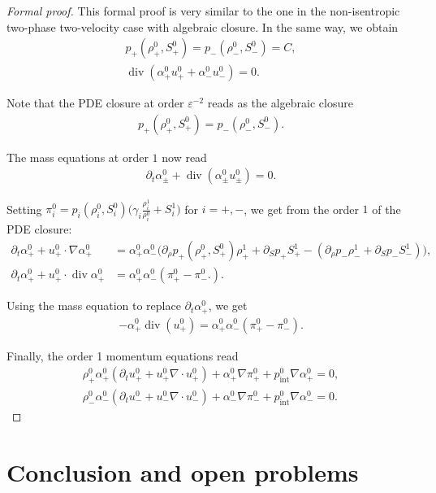 \documentclass[11pt, twoside, a4paper]{article}
\theoremstyle{plain}
\theoremstyle{remark}
\numberwithin{equation}{section}
\renewcommand{\div}{\operatorname{div}}
\newcommand{\dt}{\partial_t}
\newcommand{\eps}{\varepsilon}
\newcommand{\ap}{\alpha_+}
\newcommand{\am}{\alpha_-}
\newcommand{\rp}{\rho_+}
\newcommand{\rmi}{\rho_-}
\begin{document}
\begin{proof}[Formal proof]
This formal proof is very similar to the one in the non-isentropic two-phase two-velocity case with algebraic closure. In the same way, we obtain
\begin{align*}
     p_+ (\rp^0,S_+^0) = p_-(\rmi^0,S_-^0) = C,\\
     \div (\ap^0 u_+^0 + \am^0 u_-^0) = 0.
\end{align*}

Note that the PDE closure at order $\eps^{-2}$ reads as the algebraic closure
\begin{align*}
    p_+ (\rp^0,S_+^0) = p_-(\rmi^0,S_-^0).
\end{align*}


The mass equations at order $1$ now read
\begin{align*}
    \dt \alpha_\pm^0 + \div (\alpha_\pm^0 u_\pm^0)=0.
\end{align*}

Setting $\pi_i^0 = p_i(\rho_i^0,S_i^0) \Big( \gamma_i \frac{\rho_i^1}{\rho_i^0} + S_i^1 \Big)$ for $i=+,-$, we get from the order $1$ of the PDE closure:
\begin{align*}
    \dt \ap^0 + u_+^0 \cdot \nabla \ap^0 &= \ap^0 \am^0 \Big( \partial_\rho p_+(\rp^0,S_+^0)\rp^1 + \partial_S p_+ S_+^1 - (\partial_\rho p_- \rmi^1 + \partial_S p_- S_-^1) \Big),\\
    \dt \ap^0 + u_+^0 \cdot \div \ap^0 &= \ap^0 \am^0 (\pi_+^0 - \pi_-^0. ).
\end{align*}

Using the mass equation to replace $\dt \ap^0$, we get
\begin{align*}
    -\ap^0 \div(u_+^0) = \ap^0 \am^0 (\pi_+^0 - \pi_-^0 ).
\end{align*}


Finally, the order 1 momentum equations read
\begin{align*}
    \rp^0 \ap^0 ( \dt u_+^0 + u_+^0 \nabla \cdot u_+^0) + \ap^0 \nabla \pi_+^0 + p_{\mathrm{int}}^0 \nabla \ap^0 = 0,\\
    \rmi^0 \am^0 (\dt u_-^0 + u_-^0 \nabla \cdot u_-^0) + \am^0 \nabla \pi_-^0 + p_{\mathrm{int}}^0 \nabla \am^0 = 0.
\end{align*}

\end{proof}



\section{Conclusion and open problems}\label{Opb}
\end{document}

